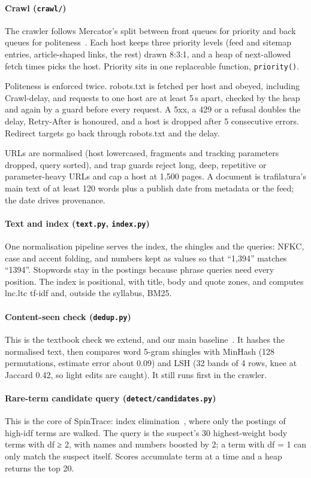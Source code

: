 \documentclass[11pt,a4paper]{article}
\newcommand{\code}[1]{\texttt{#1}}
\begin{document}
\paragraph{Crawl (\code{crawl/})} The crawler follows Mercator's split between front queues for priority and back queues for politeness~\cite{heydon1999}. Each host keeps three priority levels (feed and sitemap entries, article-shaped links, the rest) drawn 8:3:1, and a heap of next-allowed fetch times picks the host. Priority sits in one replaceable function, \code{priority()}.

Politeness is enforced twice. robots.txt is fetched per host and obeyed, including Crawl-delay, and requests to one host are at least 5\,s apart, checked by the heap and again by a guard before every request. A 5xx, a 429 or a refusal doubles the delay, Retry-After is honoured, and a host is dropped after 5 consecutive errors. Redirect targets go back through robots.txt and the delay.

URLs are normalised (host lowercased, fragments and tracking parameters dropped, query sorted), and trap guards reject long, deep, repetitive or parameter-heavy URLs and cap a host at 1,500 pages. A document is trafilatura's main text of at least 120 words plus a publish date from metadata or the feed; the date drives provenance.

\paragraph{Text and index (\code{text.py}, \code{index.py})} One normalisation pipeline serves the index, the shingles and the queries: NFKC, case and accent folding, and numbers kept as values so that ``1,394'' matches ``1394''. Stopwords stay in the postings because phrase queries need every position. The index is positional, with title, body and quote zones, and computes lnc.ltc tf-idf and, outside the syllabus, BM25.

\paragraph{Content-seen check (\code{dedup.py})} This is the textbook check we extend, and our main baseline~\cite{broder1997,iir2008}. It hashes the normalised text, then compares word 5-gram shingles with MinHash (128 permutations, estimate error about 0.09) and LSH (32 bands of 4 rows, knee at Jaccard 0.42, so light edits are caught). It still runs first in the crawler.

\paragraph{Rare-term candidate query (\code{detect/candidates.py})} This is the core of SpinTrace: index elimination~\cite[ch.~7]{iir2008}, where only the postings of high-idf terms are walked. The query is the suspect's 30 highest-weight body terms with df ≥ 2, with names and numbers boosted by 2; a term with df = 1 can only match the suspect itself. Scores accumulate term at a time and a heap returns the top 20.
\end{document}
